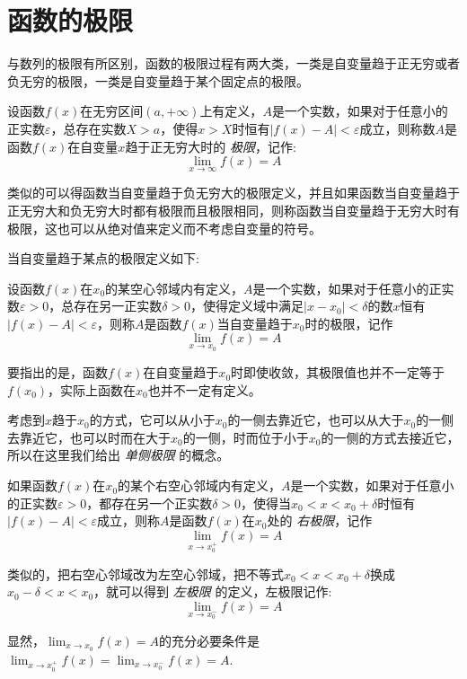 
\section{函数的极限}
\label{sec:the-limit-concept-of-function}

与数列的极限有所区别，函数的极限过程有两大类，一类是自变量趋于正无穷或者负无穷的极限，一类是自变量趋于某个固定点的极限。

\begin{definition}
  设函数$f(x)$在无穷区间$(a,+\infty)$上有定义，$A$是一个实数，如果对于任意小的正实数$\varepsilon$，总存在实数$X>a$，使得$x>X$时恒有$|f(x)-A|<\varepsilon$成立，则称数$A$是函数$f(x)$在自变量$x$趋于正无穷大时的 \emph{极限}，记作:
  \[ \lim_{x\to\infty}f(x) = A \]
\end{definition}
类似的可以得函数当自变量趋于负无穷大的极限定义，并且如果函数当自变量趋于正无穷大和负无穷大时都有极限而且极限相同，则称函数当自变量趋于无穷大时有极限，这也可以从绝对值来定义而不考虑自变量的符号。

当自变量趋于某点的极限定义如下:
\begin{definition}
  设函数$f(x)$在$x_0$的某空心邻域内有定义，$A$是一个实数，如果对于任意小的正实数$\varepsilon>0$，总存在另一正实数$\delta>0$，使得定义域中满足$|x-x_0|<\delta$的数$x$恒有$|f(x)-A|<\varepsilon$，则称$A$是函数$f(x)$当自变量趋于$x_0$时的极限，记作
  \[ \lim_{x\to x_0} f(x) = A \]
\end{definition}
要指出的是，函数$f(x)$在自变量趋于$x_0$时即使收敛，其极限值也并不一定等于$f(x_0)$，实际上函数在$x_0$也并不一定有定义。

考虑到$x$趋于$x_0$的方式，它可以从小于$x_0$的一侧去靠近它，也可以从大于$x_0$的一侧去靠近它，也可以时而在大于$x_0$的一侧，时而位于小于$x_0$的一侧的方式去接近它，所以在这里我们给出 \emph{单侧极限} 的概念。

\begin{definition}
  如果函数$f(x)$在$x_0$的某个右空心邻域内有定义，$A$是一个实数，如果对于任意小的正实数$\varepsilon>0$，都存在另一个正实数$\delta>0$，使得当$x_0<x<x_0+\delta$时恒有$|f(x)-A|<\varepsilon$成立，则称$A$是函数$f(x)$在$x_0$处的 \emph{右极限}，记作
  \[ \lim_{x \to x_0^+} f(x) = A \]
\end{definition}
类似的，把右空心邻域改为左空心邻域，把不等式$x_0<x<x_0+\delta$换成$x_0-\delta<x<x_0$，就可以得到 \emph{左极限} 的定义，左极限记作:
  \[ \lim_{x \to x_0^-} f(x) = A \]

  显然，$\lim_{x \to x_0} f(x) = A$的充分必要条件是 $\lim_{x \to x_0^+} f(x) = \lim_{x \to x_0^-} f(x) = A$.

